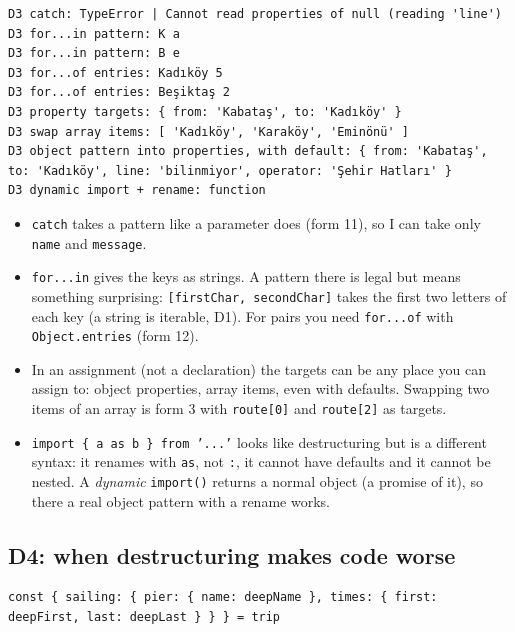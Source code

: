 \documentclass[
  10pt,
]{article}
\providecommand{\tightlist}{%
  \setlength{\itemsep}{0pt}\setlength{\parskip}{0pt}}
\begin{document}
\begin{verbatim}
D3 catch: TypeError | Cannot read properties of null (reading 'line')
D3 for...in pattern: K a
D3 for...in pattern: B e
D3 for...of entries: Kadıköy 5
D3 for...of entries: Beşiktaş 2
D3 property targets: { from: 'Kabataş', to: 'Kadıköy' }
D3 swap array items: [ 'Kadıköy', 'Karaköy', 'Eminönü' ]
D3 object pattern into properties, with default: { from: 'Kabataş', to: 'Kadıköy', line: 'bilinmiyor', operator: 'Şehir Hatları' }
D3 dynamic import + rename: function
\end{verbatim}

\begin{itemize}
\tightlist
\item
  \texttt{catch} takes a pattern like a parameter does (form 11), so I
  can take only \texttt{name} and \texttt{message}.
\item
  \texttt{for.\allowbreak{}.\allowbreak{}.\allowbreak{}in} gives the
  keys as strings. A pattern there is legal but means something
  surprising: \texttt{[\allowbreak{}firstChar,\allowbreak{} secondChar]}
  takes the first two letters of each key (a string is iterable, D1).
  For pairs you need
  \texttt{for.\allowbreak{}.\allowbreak{}.\allowbreak{}of} with
  \texttt{Object.\allowbreak{}entries} (form 12).
\item
  In an assignment (not a declaration) the targets can be any place you
  can assign to: object properties, array items, even with defaults.
  Swapping two items of an array is form 3 with
  \texttt{route[\allowbreak{}0]} and \texttt{route[\allowbreak{}2]} as
  targets.
\item
  \texttt{import \{ a as b \} from '.\allowbreak{}.\allowbreak{}.\allowbreak{}'}
  looks like destructuring but is a different syntax: it renames with
  \texttt{as}, not \texttt{:\allowbreak{}}, it cannot have defaults and
  it cannot be nested. A \emph{dynamic} \texttt{import(\allowbreak{})}
  returns a normal object (a promise of it), so there a real object
  pattern with a rename works.
\end{itemize}

\hypertarget{d4-when-destructuring-makes-code-worse}{%
\subsection{D4: when destructuring makes code
worse}\label{d4-when-destructuring-makes-code-worse}}

\begin{verbatim}
const { sailing: { pier: { name: deepName }, times: { first: deepFirst, last: deepLast } } } = trip
\end{verbatim}
\end{document}
